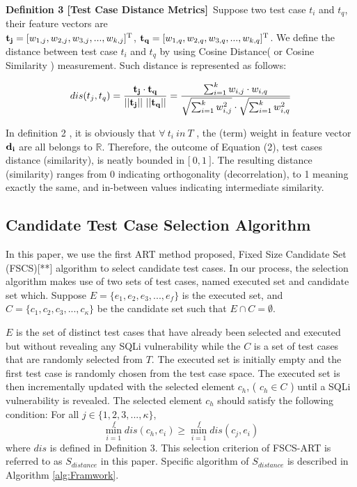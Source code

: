 \documentclass{sig-alternate}
\begin{document}
{\bf Definition 3 [Test Case Distance Metrics]}~Suppose two test case $t_{i}$ and $t_{q}$, their feature vectors are\\ ${\bf t_{j}} = [w_{1,j}, w_{2,j}, w_{3,j},...,w_{k,j}]^{\mathrm T}$, ${\bf t_{q}} = [w_{1,q}, w_{2,q}, w_{3,q},...,w_{k,q}]^{\mathrm T}$. We define the distance between test case $t_{i}$ and $t_{q}$ by using Cosine Distance( or Cosine Similarity ) measurement. Such distance is represented as follows:

\begin{equation}dis(t_{j}, t_{q}) = \frac{  {\bf t_{j}} \cdot {\bf t_{q} } }{ || {\bf t_{j} } || ~||  {\bf t_{q}} || } = \frac{ \sum_{i=1}^{k} w_{i,j}\cdot w_{i,q} }{\sqrt{  \sum_{i=1}^{k} w_{i,j}^{2} } \cdot \sqrt{ \sum_{i=1}^{k} w_{i,q}^{2}  }  }\end{equation}

In definition 2 , it is obviously that $\forall ~t_{i}~ in ~T$ , the (term) weight in feature vector $\bf d_{i}$ are all belongs to $\mathbb{R}$. Therefore, the outcome of Equation (2), test cases distance (similarity), is neatly bounded in $\lbrack ~0, 1 ~\rbrack$. The resulting distance (similarity) ranges from 0 indicating orthogonality (decorrelation), to 1 meaning exactly the same, and in-between values indicating intermediate similarity.




\subsection{Candidate Test Case Selection Algorithm}
In this paper,  we use the first ART method proposed, Fixed Size Candidate Set (FSCS)[**] algorithm to select candidate test cases. In our process, the selection algorithm makes use of two sets of test cases, named executed set and candidate set which. Suppose $E = \{e_{1}, e_{2}, e_{3}, ..., e_{f}\}$ is the executed set, and $C= \{c_{1}, c_{2}, c_{3}, ..., c_{\kappa}\}$ be the candidate set such that $E \cap C = \emptyset$.  


 $E$ is the set of distinct test cases that have already been selected and executed but without revealing any SQLi vulnerability while the $C$ is a set of test cases that are randomly selected from $T$. The executed set is initially empty and the first test case is randomly chosen from the test case space. The executed set is then incrementally updated with the selected element $c_{h}$, ( $c_{h} \in C$ ) until a SQLi vulnerability is revealed. The selected element $c_{h}$ should satisfy the following condition:
For all $ j \in \{1, 2, 3, ..., \kappa\} $, $$\min_{i=1}^{f} dis(c_{h}, e_{i}) \geq \min_{i=1}^{f} dis(c_{j}, e_{i}) $$
where $dis$ is defined in Definition 3. This selection criterion of FSCS-ART is referred to as $S_{distance}$ in this paper. Specific algorithm of $S_{distance}$ is described in Algorithm \ref{alg:Framwork}.
\end{document}
